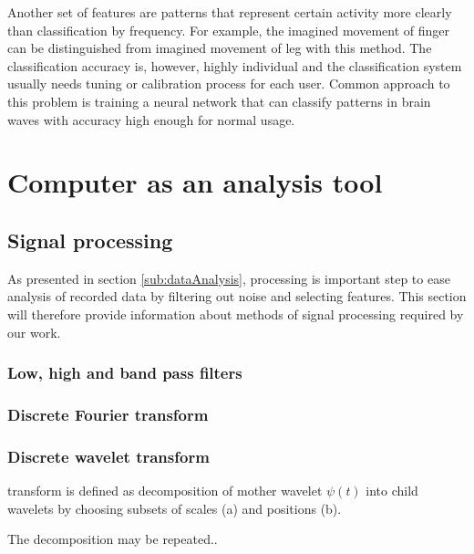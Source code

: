 Another set of features are patterns that represent certain activity more
clearly than classification by frequency. For example, the imagined movement of
finger can be distinguished from imagined movement of leg with this method. The
classification accuracy is, however, highly individual and the classification
system usually needs tuning or calibration process for each user. \cite{bcComm}
Common approach to this problem is training a neural network that can classify
patterns in brain waves with accuracy high enough for normal usage.

\chapter{Computer as an analysis tool}

\section{Signal processing}
\label{sec:sigProc}
As presented in section \ref{sub:dataAnalysis}, processing is important
step to ease analysis of recorded data by filtering out noise and selecting
features. This section will therefore provide information about methods of
signal processing required by our work.


\subsection{Low, high and band pass filters}

\subsection{Discrete Fourier transform}

\subsection{Discrete wavelet transform}
transform is defined as decomposition of mother wavelet $\psi(t)$ into child
wavelets by choosing subsets of scales (a) and positions (b). 

The decomposition may be repeated..
